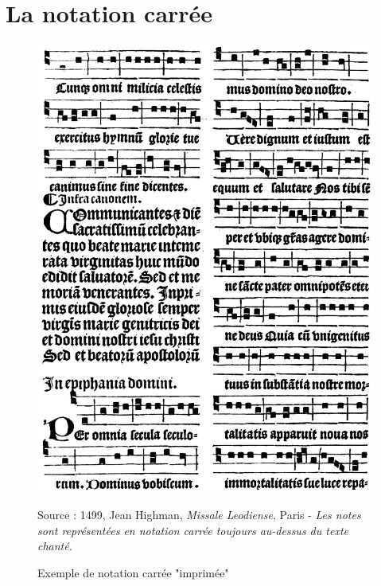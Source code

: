 \section{La notation carrée}
\label{sec:exempleNotationCarree}
\begin{figure}[H]
	\centering
	\includegraphics[keepaspectratio=true, width=\textwidth]{Annexes/i/notationCarree.jpg}
	\caption{Exemple de notation carrée "imprimée"}
	\medskip
	\small
	Source : 1499, Jean Highman, \textit{Missale Leodiense}, Paris - \textit{Les notes sont représentées en notation carrée toujours au-dessus du texte chanté.}
	\label{fig:notationCarree}
\end{figure}
\clearpage

